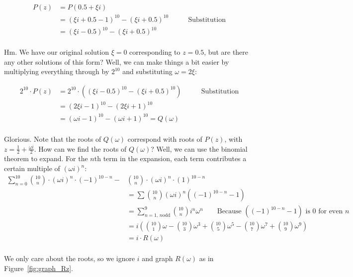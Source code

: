 \documentclass{article}
\begin{document}
\begin{align*}
    P(z)&=P(0.5+\xi i) \\
    &= (\xi i + 0.5 - 1)^{10} - (\xi i + 0.5)^{10} \qquad & \text{Substitution} \\
    &= (\xi i - 0.5)^{10} - (\xi i + 0.5)^{10} \\
\end{align*}

Hm. We have our original solution $\xi=0$ corresponding to $z=0.5$, but are there any other solutions of this form? Well, we can make things a bit easier by multiplying everything through by $2^{10}$ and substituting $\omega = 2\xi$:

\begin{align*}
    2^{10} \cdot P(z) &= 2^{10} \cdot ((\xi i - 0.5)^{10} - (\xi i + 0.5)^{10}) \qquad & \text{Substitution} \\
    &= (2\xi i - 1)^{10} - (2\xi i + 1)^{10} \\
    &= (\omega i - 1) ^ {10} - (\omega i + 1)^{10} = Q(\omega) \\
\end{align*}

    Glorious. Note that the roots of $Q(\omega)$ correspond with roots of $P(z)$, with $z=\frac{1}{2} + \frac{\omega i}{2}$. How can we find the roots of $Q(\omega)$? Well, we can use the binomial theorem to expand. For the $n$th term in the expansion, each term contributes a certain multiple of $(\omega i)^n$:
\begin{align*}
    \sum_{n=0}^{10}\binom{10}{n}\cdot (\omega i)^{n}\cdot (-1)^{10-n} -& \binom{10}{n}\cdot (\omega i)^{n}\cdot (1)^{10-n} \\
    &= \sum\binom{10}{n}(\omega i)^n((-1)^{10-n} - 1) \\
    &= \sum_{n=1,\,n\text{odd}}^{9}\binom{10}{n}i^n\omega^n\qquad \text{Because $((-1)^{10-n}-1)$ is $0$ for even $n$} \\
    &= i\left(\binom{10}{1}\omega-\binom{10}{3}\omega^3+\binom{10}{5}\omega^5-\binom{10}{7}\omega^7+\binom{10}{9}\omega^9\right) \\
    &= i\cdot R(\omega) \\
\end{align*}

We only care about the roots, so we ignore $i$ and graph $R(\omega)$ as in Figure~\ref{fig:graph_Rz}.
\end{document}
